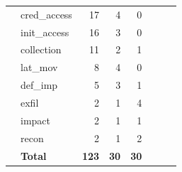 \documentclass[10pt]{article}
\begin{document}
\begin{table}[!ht]
\begin{minipage}[t]{0.45\textwidth}
{\begin{tabular}{c l r r r r r r}
  & cred\_access & 17  & 4  & 0  & & & \\
  & init\_access & 16  & 3  & 0  & & & \\
  & collection   & 11  & 2  & 1  & & & \\
  & lat\_mov     & 8   & 4  & 0  & & & \\
  & def\_imp     & 5   & 3  & 1  & & & \\
  & exfil        & 2   & 1  & 4  & & & \\
  & impact       & 2   & 1  & 1  & & & \\
  & recon        & 2   & 1  & 2  & & & \\
  & \textbf{Total} & \textbf{123} & \textbf{30} & \textbf{30} & & & \\
\bottomrule
\end{tabular}%
}
\end{minipage}
\end{table}
\end{document}
